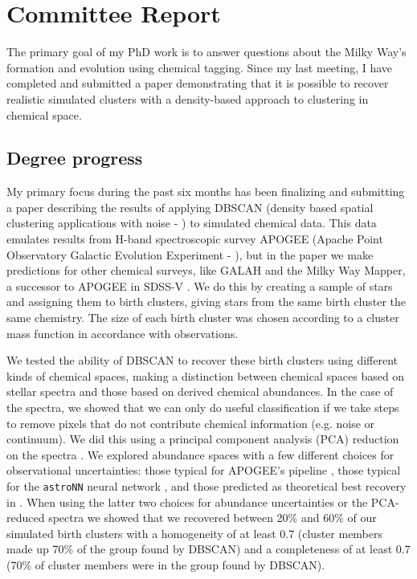 \documentclass[11pt]{article}
\begin{document}
    
    \section*{Committee Report}
    
    The primary goal of my PhD work is to answer questions about the Milky Way's formation and evolution using chemical tagging. Since my last meeting, I have completed and submitted a paper demonstrating that it is possible to recover realistic simulated clusters with a density-based approach to clustering in chemical space.    

    \subsection*{Degree progress}

	My primary focus during the past six months has been finalizing and submitting a paper describing the results of applying DBSCAN (density based spatial clustering applications with noise - \citealt{Ester1996}) to simulated chemical data. This data emulates results from H-band spectroscopic survey APOGEE (Apache Point Observatory Galactic Evolution Experiment - \citealt{Majewski2017}), but in the paper we make predictions for other chemical surveys, like GALAH \citep{DeSilva2015} and the Milky Way Mapper, a successor to APOGEE in SDSS-V \citep{Kollmeier2017}. We do this by creating a sample of stars and assigning them to birth clusters, giving stars from the same birth cluster the same chemistry. The size of each birth cluster was chosen according to a cluster mass function in accordance with observations.
	
	We tested the ability of DBSCAN  to recover these birth clusters using different kinds of chemical spaces, making a distinction between chemical spaces based on stellar spectra and those based on derived chemical abundances. In the case of the spectra, we showed that we can only do useful classification if we take steps to remove pixels that do not contribute chemical information (e.g. noise or continuum). We did this using a principal component analysis (PCA) reduction on the spectra \citep{Joliffe2002}. We explored abundance spaces with a few different choices for observational uncertainties: those typical for APOGEE's pipeline \citep{Abolfathi2018}, those typical for the \texttt{astroNN} neural network \citep{Leung2019}, and those predicted as theoretical best recovery in \citep{Ting2016b}. When using the latter two choices for abundance uncertainties or the PCA-reduced spectra we showed that we recovered between 20\% and 60\% of our simulated birth clusters with a homogeneity of at least 0.7 (cluster members made up 70\% of the group found by DBSCAN) and a completeness of at least 0.7 (70\% of cluster members were in the group found by DBSCAN). 
	
\end{document}
